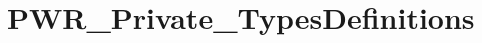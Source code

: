 \hypertarget{group___p_w_r___private___types_definitions}{}\section{P\+W\+R\+\_\+\+Private\+\_\+\+Types\+Definitions}
\label{group___p_w_r___private___types_definitions}
